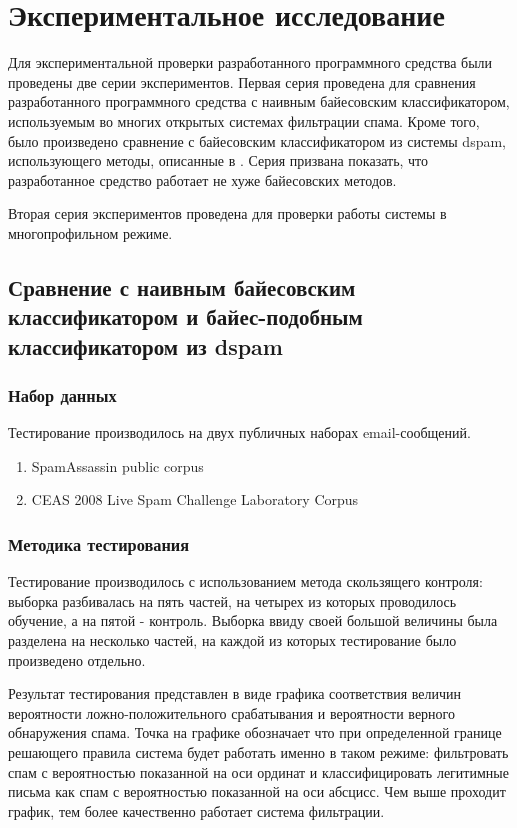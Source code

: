 \section{Экспериментальное исследование}

Для экспериментальной проверки разработанного программного средства были проведены две серии экспериментов. Первая серия проведена для сравнения разработанного программного средства с наивным байесовским классификатором, используемым во многих открытых системах фильтрации спама. Кроме того, было произведено сравнение с байесовским классификатором из системы dspam, использующего методы, описанные в \cite{ROBINSON} . Серия призвана показать, что разработанное средство работает не хуже байесовских методов.

Вторая серия экспериментов проведена для проверки работы системы в многопрофильном режиме.

\subsection{Сравнение с наивным байесовским классификатором и байес-подобным классификатором из dspam}

\subsubsection {Набор данных}

Тестирование производилось на двух публичных наборах email-сообщений.

\begin{enumerate}
	\item SpamAssassin public corpus \cite{SAPC}
	\item CEAS 2008 Live Spam Challenge Laboratory Corpus \cite{CEAS}
\end{enumerate}

\subsubsection{Методика тестирования}

Тестирование производилось с использованием метода скользящего контроля: выборка разбивалась на пять частей, на четырех из которых проводилось обучение, а на пятой - контроль. Выборка \cite{CEAS} ввиду своей большой величины была разделена на несколько частей, на каждой из которых тестирование было произведено отдельно. 

Результат тестирования представлен в виде графика соответствия величин вероятности ложно-положительного срабатывания и вероятности верного обнаружения спама. Точка на графике обозначает что при определенной границе решающего правила система будет работать именно в таком режиме: фильтровать спам с вероятностью показанной на оси ординат и классифицировать легитимные письма как спам с вероятностью показанной на оси абсцисс. Чем выше проходит график, тем более качественно работает система фильтрации.

